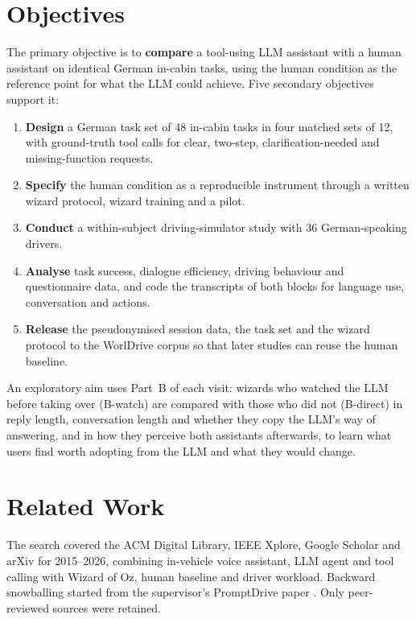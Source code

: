 \documentclass[
    a4paper,
    11pt,
    DIV=11,
    bigheadings,
    idxtotoc,
    listof=totoc,
    bibtotoc,
    halfparskip,
    cleardoubleempty,
    openright,
    oneside
]{scrartcl}
\begin{document}
\section{Objectives}

The primary objective is to \textbf{compare} a tool-using LLM assistant with a human assistant on identical German in-cabin tasks, using the human condition as the reference point for what the LLM could achieve.
Five secondary objectives support it:

\begin{enumerate}
    \item \textbf{Design} a German task set of 48 in-cabin tasks in four matched sets of 12, with ground-truth tool calls for clear, two-step, clarification-needed and missing-function requests.
    \item \textbf{Specify} the human condition as a reproducible instrument through a written wizard protocol, wizard training and a pilot.
    \item \textbf{Conduct} a within-subject driving-simulator study with 36 German-speaking drivers.
    \item \textbf{Analyse} task success, dialogue efficiency, driving behaviour and questionnaire data, and code the transcripts of both blocks for language use, conversation and actions.
    \item \textbf{Release} the pseudonymised session data, the task set and the wizard protocol to the WorlDrive corpus so that later studies can reuse the human baseline.
\end{enumerate}

An exploratory aim uses Part~B of each visit: wizards who watched the LLM before taking over (B-watch) are compared with those who did not (B-direct) in reply length, conversation length and whether they copy the LLM's way of answering, and in how they perceive both assistants afterwards, to learn what users find worth adopting from the LLM and what they would change.

\section{Related Work}

The search covered the ACM Digital Library, IEEE Xplore, Google Scholar and arXiv for 2015--2026, combining in-vehicle voice assistant, LLM agent and tool calling with Wizard of Oz, human baseline and driver workload.
Backward snowballing started from the supervisor's PromptDrive paper \cite{Alvarez26Do}.
Only peer-reviewed sources were retained.
\end{document}
